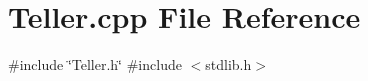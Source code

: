 \section{Teller.\+cpp File Reference}
\label{Teller_8cpp}
{\ttfamily \#include \char`\"{}Teller.\+h\char`\"{}}\newline
{\ttfamily \#include $<$stdlib.\+h$>$}\newline

